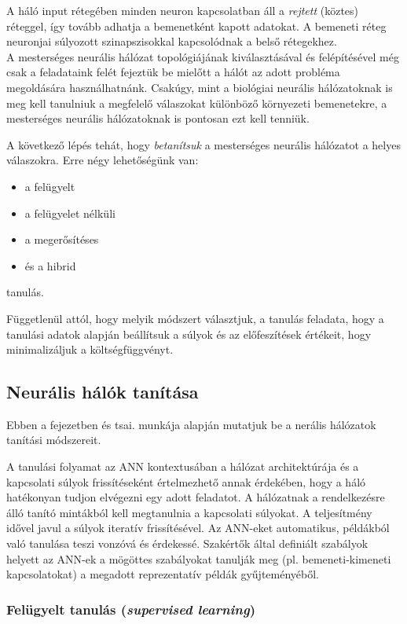 \documentclass[12pt,a4]{article}
\begin{document}
	A háló input rétegében minden neuron kapcsolatban áll a \textit{rejtett} (köztes) réteggel, így tovább adhatja a bemenetként kapott adatokat. A bemeneti réteg neuronjai súlyozott szinapszisokkal kapcsolódnak a belső rétegekhez.\\
	
	A mesterséges neurális hálózat 
	topológiájának kiválasztásával és 
	felépítésével még csak a feladataink 
	felét fejeztük be mielőtt a hálót az 
	adott probléma megoldására használhatnánk.
	Csakúgy, mint a biológiai neurális hálózatoknak
	is meg kell tanulniuk a megfelelő válaszokat különböző környezeti bemenetekre, a mesterséges neurális hálózatoknak is pontosan ezt kell tenniük.
	
	
	A következő lépés tehát, hogy \textit{betanítsuk} a mesterséges neurális hálózatot a helyes válaszokra.
	Erre négy lehetőségünk van:
	\begin{itemize}
		\item a felügyelt
		\item a felügyelet nélküli
		\item a megerősítéses
		\item és a hibrid
	\end{itemize}
	tanulás.
	
	 Függetlenül attól, hogy melyik módszert választjuk, a tanulás feladata, hogy a tanulási adatok alapján beállítsuk a súlyok és az előfeszítések értékeit, hogy minimalizáljuk a 
	költségfüggvényt.
	
	\subsection{Neurális hálók tanítása}
    Ebben a fejezetben \cite{krenker} és tsai. munkája alapján mutatjuk be a nerális hálózatok tanítási módszereit.
 
	A tanulási folyamat \cite{ann2} az ANN kontextusában a
	hálózat architektúrája és a kapcsolati súlyok frissítéseként értelmezhető annak érdekében, hogy a háló hatékonyan tudjon elvégezni egy adott feladatot.
	A hálózatnak a rendelkezésre álló tanító mintákból kell megtanulnia a kapcsolati súlyokat. A teljesítmény idővel javul a súlyok iteratív frissítésével.
	Az ANN-eket automatikus, példákból való tanulása teszi 
	vonzóvá és érdekessé. Szakértők által definiált szabályok helyett az ANN-ek a mögöttes szabályokat tanulják meg (pl. bemeneti-kimeneti kapcsolatokat) a megadott reprezentatív példák gyűjteményéből.
	
	\subsubsection{Felügyelt tanulás (\textit{supervised learning})}
	
\end{document}
